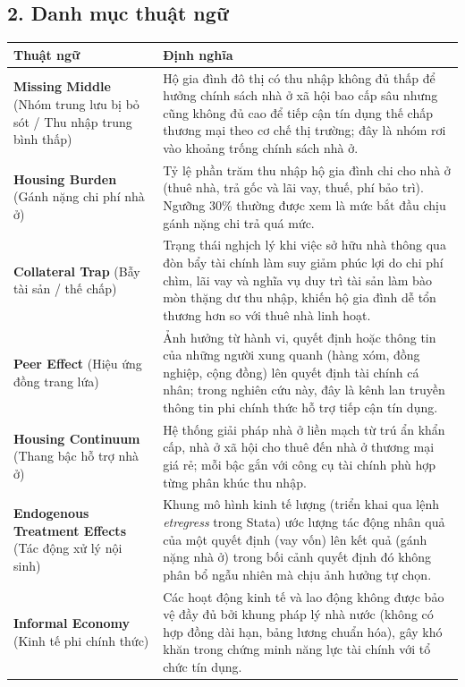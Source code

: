 \documentclass[12pt,a4paper]{report}
\begin{document}
\subsection*{2. Danh mục thuật ngữ}

\begin{table}[H]
	\centering
	\footnotesize
	\renewcommand{\arraystretch}{1.1}
	\begin{tabularx}{\textwidth}{>{\raggedright\arraybackslash}p{3.6cm} X}
		\toprule
		\textbf{Thuật ngữ} & \textbf{Định nghĩa} \\
		\midrule
		
		\textbf{Missing Middle} 
		(Nhóm trung lưu bị bỏ sót / Thu nhập trung bình thấp) 
		& Hộ gia đình đô thị có thu nhập không đủ thấp để hưởng chính sách nhà ở xã hội bao cấp sâu nhưng cũng không đủ cao để tiếp cận tín dụng thế chấp thương mại theo cơ chế thị trường; đây là nhóm rơi vào khoảng trống chính sách nhà ở. \\
		
		\textbf{Housing Burden} 
		(Gánh nặng chi phí nhà ở) 
		& Tỷ lệ phần trăm thu nhập hộ gia đình chi cho nhà ở (thuê nhà, trả gốc và lãi vay, thuế, phí bảo trì). Ngưỡng 30\% thường được xem là mức bắt đầu chịu gánh nặng chi trả quá mức. \\
		
		\textbf{Collateral Trap} 
		(Bẫy tài sản / thế chấp) 
		& Trạng thái nghịch lý khi việc sở hữu nhà thông qua đòn bẩy tài chính làm suy giảm phúc lợi do chi phí chìm, lãi vay và nghĩa vụ duy trì tài sản làm bào mòn thặng dư thu nhập, khiến hộ gia đình dễ tổn thương hơn so với thuê nhà linh hoạt. \\
		
		\textbf{Peer Effect} 
		(Hiệu ứng đồng trang lứa) 
		& Ảnh hưởng từ hành vi, quyết định hoặc thông tin của những người xung quanh (hàng xóm, đồng nghiệp, cộng đồng) lên quyết định tài chính cá nhân; trong nghiên cứu này, đây là kênh lan truyền thông tin phi chính thức hỗ trợ tiếp cận tín dụng. \\
		
		\textbf{Housing Continuum} 
		(Thang bậc hỗ trợ nhà ở) 
		& Hệ thống giải pháp nhà ở liền mạch từ trú ẩn khẩn cấp, nhà ở xã hội cho thuê đến nhà ở thương mại giá rẻ; mỗi bậc gắn với công cụ tài chính phù hợp từng phân khúc thu nhập. \\
		
		\textbf{Endogenous Treatment Effects} 
		(Tác động xử lý nội sinh) 
		& Khung mô hình kinh tế lượng (triển khai qua lệnh \textit{etregress} trong Stata) ước lượng tác động nhân quả của một quyết định (vay vốn) lên kết quả (gánh nặng nhà ở) trong bối cảnh quyết định đó không phân bổ ngẫu nhiên mà chịu ảnh hưởng tự chọn. \\
		
		\textbf{Informal Economy} 
		(Kinh tế phi chính thức) 
		& Các hoạt động kinh tế và lao động không được bảo vệ đầy đủ bởi khung pháp lý nhà nước (không có hợp đồng dài hạn, bảng lương chuẩn hóa), gây khó khăn trong chứng minh năng lực tài chính với tổ chức tín dụng. \\
		
		\bottomrule
	\end{tabularx}
\end{table}
\end{document}
